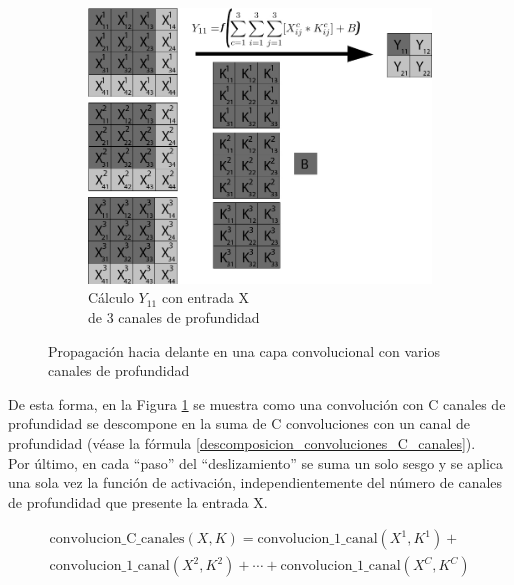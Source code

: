 \begin{figure}[H]
	\vspace{5mm}
	\begin{subfigure}{.5\textwidth}
		\hspace{-10mm}
		\includegraphics[width=1.2\linewidth]{imagenes/conv_1_3canales.jpg}  
		\caption{Cálculo $Y_{11}$ con entrada X \\ de 3 canales de profundidad}
	\end{subfigure}
	\caption{Propagación hacia delante en una capa convolucional con varios canales de profundidad}
	\label{fig:forward_prop_convolucional_canales_profundidad}
\end{figure}

De esta forma, en la Figura \ref{fig:forward_prop_convolucional_canales_profundidad} se muestra como una convolución con C canales de profundidad se descompone en la suma de C convoluciones con un canal de profundidad (véase la fórmula \ref{descomposicion_convoluciones_C_canales}).  \\
Por último, en cada ``paso'' del ``deslizamiento'' se suma un solo sesgo y se aplica una sola vez la función de activación, independientemente del número de canales de profundidad que presente la entrada X.

\begin{equation}
	\begin{split}
		\text{convolucion\_C\_canales}(X,K) = \text{convolucion\_1\_canal}(X^1,K^1) + \\
		\text{convolucion\_1\_canal}(X^2,K^2) + \cdots + \text{convolucion\_1\_canal}(X^C,K^C)
	\end{split}
	\label{descomposicion_convoluciones_C_canales}
\end{equation}


